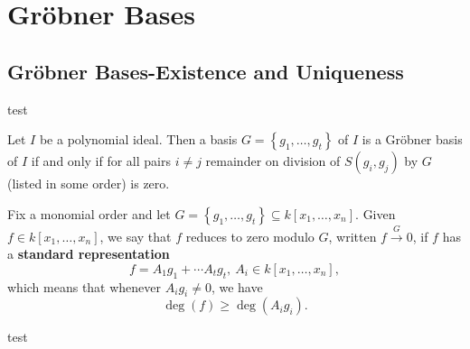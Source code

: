 \chapter{Gr{\"o}bner Bases} 

\section{Gr{\"o}bner Bases-Existence and Uniqueness}

\begin{theorem}
    test
\end{theorem}

\begin{definition}\label{def:Buchberger’s Criterion} %
    Let $I$ be a polynomial ideal. Then a basis
    $ G = \left\{g_1, \ldots , g_t\right\}$ of $I$ is a Gröbner basis of $I$ if and only if for all pairs $i \neq j$
    remainder on division of $S(g_i, g_j)$ by $G$ (listed in some order) is zero.
\end{definition}

\begin{definition}\label{def:reduces_to_zero} %
    Fix a monomial order and let $G = \left\{g_1, \ldots , g_t\right\} \subseteq k[x_1, \ldots , x_n]$.
    Given $f \in k[x_1, \ldots , x_n]$, we say that $f$ reduces to zero modulo $G$, written $f \xrightarrow{G} 0$,
    if $f$ has a \textbf{standard representation}
    \[ f = A_1g_1 + \cdots A_tg_t,\ A_i \in k[x_1, \ldots , x_n],\]
    which means that whenever $A_ig_i \neq 0$, we have
    \[\operatorname{deg}(f) ≥ \operatorname{deg}(A_ig_i).\]
\end{definition}

\begin{theorem}
    test
\end{theorem}